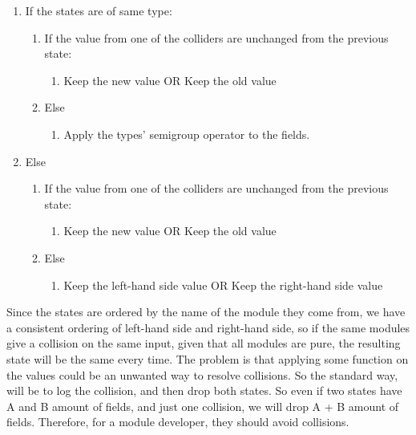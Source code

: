 \begin{enumerate}
  \item If the states are of same type:
    \begin{enumerate}
      \item If the value from one of the colliders are unchanged from the previous state:
        \begin{enumerate}
          \item Keep the new value OR Keep the old value
        \end{enumerate}
      \item Else
        \begin{enumerate}
          \item Apply the types' semigroup operator to the fields.
        \end{enumerate}
    \end{enumerate}
  \item Else
    \begin{enumerate}
      \item If the value from one of the colliders are unchanged from the previous state:
        \begin{enumerate}
          \item Keep the new value OR Keep the old value
        \end{enumerate}
      \item Else
        \begin{enumerate}
          \item Keep the left-hand side value OR Keep the right-hand side value
        \end{enumerate}
    \end{enumerate}
\end{enumerate}

Since the states are ordered by the name of the module they come from, we
have a consistent ordering of left-hand side and right-hand side, so if the same
modules give a collision on the same input, given that all modules are pure, the
resulting state will be the same every time. The problem is that applying some
function on the values could be an unwanted way to resolve collisions. So the
standard way, will be to log the collision, and then drop both states. So even
if two states have A and B amount of fields, and just one collision, we will
drop A + B amount of fields. Therefore, for a module developer, they should avoid
collisions.


